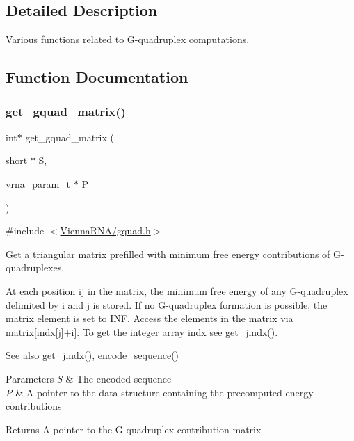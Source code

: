 \subsection{Detailed Description}
Various functions related to G-\/quadruplex computations. 



\subsection{Function Documentation}
\mbox{\label{group__gquads_ga392e45c9615aa123737671603fa4203c}} 
\subsubsection{\texorpdfstring{get\+\_\+gquad\+\_\+matrix()}{get\_gquad\_matrix()}}
{\footnotesize\ttfamily int$\ast$ get\+\_\+gquad\+\_\+matrix (\begin{DoxyParamCaption}\item[{short $\ast$}]{S,  }\item[{\hyperlink{group__energy__parameters_ga8a69ca7d787e4fd6079914f5343a1f35}{vrna\+\_\+param\+\_\+t} $\ast$}]{P }\end{DoxyParamCaption})}



{\ttfamily \#include $<$\hyperlink{gquad_8h}{Vienna\+R\+N\+A/gquad.\+h}$>$}



Get a triangular matrix prefilled with minimum free energy contributions of G-\/quadruplexes. 

At each position ij in the matrix, the minimum free energy of any G-\/quadruplex delimited by i and j is stored. If no G-\/quadruplex formation is possible, the matrix element is set to I\+NF. Access the elements in the matrix via matrix\mbox{[}indx\mbox{[}j\mbox{]}+i\mbox{]}. To get the integer array indx see get\+\_\+jindx().

\begin{DoxySeeAlso}{See also}
get\+\_\+jindx(), encode\+\_\+sequence()
\end{DoxySeeAlso}

\begin{DoxyParams}{Parameters}
{\em S} & The encoded sequence \\
\hline
{\em P} & A pointer to the data structure containing the precomputed energy contributions \\
\hline
\end{DoxyParams}
\begin{DoxyReturn}{Returns}
A pointer to the G-\/quadruplex contribution matrix 
\end{DoxyReturn}
\mbox{\label{group__gquads_gae41763215b9c64d2a7b67f0df8a28078}} 
